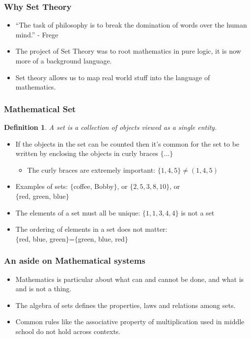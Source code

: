 \documentclass[aspectratio=169]{beamer}
\newtheorem{defn}{Definition}
\numberwithin{equation}{section}
\begin{document}
\begin{frame}
\frametitle{Why Set Theory}
\begin{itemize}
\item ``The task of philosophy is to break the domination of words over the human mind.'' - Frege
\item The project of Set Theory was to root mathematics in pure logic, it is now more of a background language.
\item Set theory allows us to map real world stuff into the language of mathematics.
\end{itemize}
\end{frame}





\begin{frame}
\frametitle{Mathematical Set}

\begin{defn}
A set is a collection of objects viewed as a single entity.
\end{defn}
\pause

\begin{itemize}
\item If the objects in the set can be counted then it's common for the set to be written by enclosing the objects in curly braces $\{...\}$ \pause
 
\begin{itemize}
\item The curly braces are extremely important: $\{1, 4, 5\}\not=(1, 4, 5)$ \pause
\end{itemize}
 
\item Examples of sets: $\{$coffee, Bobby$\}$, or $\{2, 5, 3, 8, 10\}$, or \\$\{$red, green, blue$\}$ \pause
 
\item The elements of a set must all be unique: $\{1, 1, 3, 4, 4\}$ is not a set \pause

\item The ordering of elements in a set does not matter: \\$\{$red, blue, green$\}$=$\{$green, blue, red$\}$

\end{itemize}
\end{frame}


\begin{frame}
\frametitle{An aside on Mathematical systems}

\begin{itemize}
\item Mathematics is particular about what can and cannot be done, and what is and is not a thing.
\item The algebra of sets defines the properties, laws and relations among sets.
\item Common rules like the associative property of multiplication used in middle school do not hold across contexts.
\end{itemize}
\end{frame}
\end{document}
